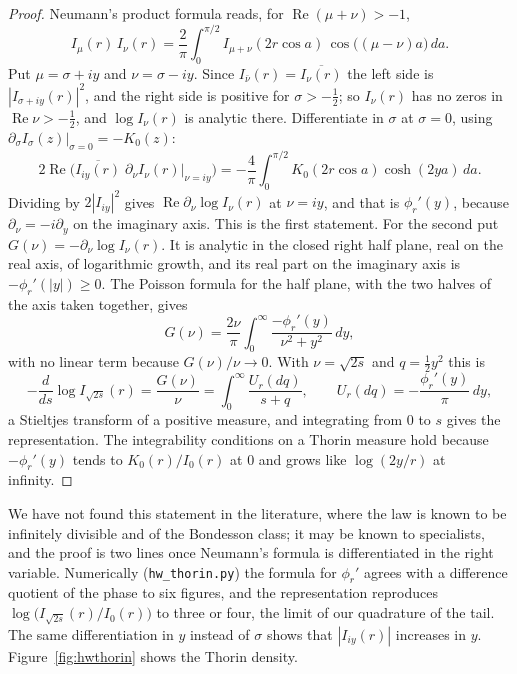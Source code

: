 \begin{proof}
Neumann's product formula \cite[\S5.43]{Wat44} reads, for $\operatorname{Re}(\mu+\nu)>-1$,
\[
I_\mu(r)\,I_\nu(r)=\frac2\pi\int_0^{\pi/2}I_{\mu+\nu}(2r\cos a)\,\cos\big((\mu-\nu)a\big)\,da .
\]
Put $\mu=\sigma+iy$ and $\nu=\sigma-iy$. Since $I_{\bar\nu}(r)=\overline{I_\nu(r)}$ the left side is $|I_{\sigma+iy}(r)|^2$, and the right side is positive for $\sigma>-\frac12$; so $I_\nu(r)$ has no zeros in $\operatorname{Re}\nu>-\frac12$, and $\log I_\nu(r)$ is analytic there. Differentiate in $\sigma$ at $\sigma=0$, using $\partial_\sigma I_\sigma(z)|_{\sigma=0}=-K_0(z)$:
\[
2\operatorname{Re}\Big(\overline{I_{iy}(r)}\;\partial_\nu I_\nu(r)\big|_{\nu=iy}\Big)=-\frac4\pi\int_0^{\pi/2}K_0(2r\cos a)\cosh(2ya)\,da .
\]
Dividing by $2|I_{iy}|^2$ gives $\operatorname{Re}\partial_\nu\log I_\nu(r)$ at $\nu=iy$, and that is $\phi_r'(y)$, because $\partial_\nu=-i\partial_y$ on the imaginary axis. This is the first statement. For the second put $G(\nu)=-\partial_\nu\log I_\nu(r)$. It is analytic in the closed right half plane, real on the real axis, of logarithmic growth, and its real part on the imaginary axis is $-\phi_r'(|y|)\ge0$. The Poisson formula for the half plane, with the two halves of the axis taken together, gives
\[
G(\nu)=\frac{2\nu}{\pi}\int_0^\infty\frac{-\phi_r'(y)}{\nu^2+y^2}\,dy ,
\]
with no linear term because $G(\nu)/\nu\to0$. With $\nu=\sqrt{2s}$ and $q=\frac12y^2$ this is
\[
-\frac{d}{ds}\log I_{\sqrt{2s}}(r)=\frac{G(\nu)}{\nu}=\int_0^\infty\frac{U_r(dq)}{s+q},\qquad U_r(dq)=-\frac{\phi_r'(y)}{\pi}\,dy,
\]
a Stieltjes transform of a positive measure, and integrating from $0$ to $s$ gives the representation. The integrability conditions on a Thorin measure hold because $-\phi_r'(y)$ tends to $K_0(r)/I_0(r)$ at $0$ and grows like $\log(2y/r)$ at infinity.
\end{proof}

We have not found this statement in the literature, where the law is known to be infinitely divisible and of the Bondesson class; it may be known to specialists, and the proof is two lines once Neumann's formula is differentiated in the right variable. Numerically (\texttt{hw\_thorin.py}) the formula for $\phi_r'$ agrees with a difference quotient of the phase to six figures, and the representation reproduces $\log\big(I_{\sqrt{2s}}(r)/I_0(r)\big)$ to three or four, the limit of our quadrature of the tail. The same differentiation in $y$ instead of $\sigma$ shows that $|I_{iy}(r)|$ increases in $y$. Figure~\ref{fig:hwthorin} shows the Thorin density.

